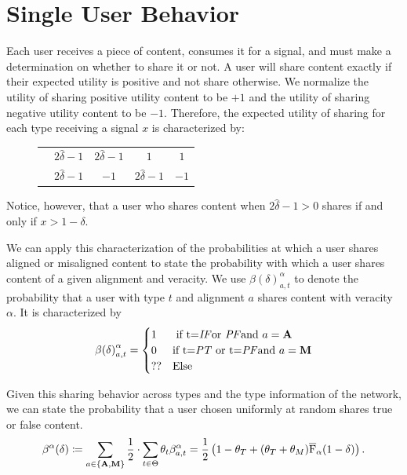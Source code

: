 \section{Single User Behavior}\label{sec:user_behavior}

Each user receives a piece of content, consumes it for a signal, and must make a determination on whether to share it or not. A user will share content exactly if their expected utility is positive and not share otherwise.  We normalize the utility of sharing positive utility content to be $+1$ and the utility of sharing negative utility content to be $-1$. Therefore, the expected utility of sharing for each type receiving a signal $x$ is characterized by: 

\begin{figure} 
    \centering 
\begin{tabular}{ccccc}
   \toprule 
   &  \IT{} & \PT{} & \IF{} & \PF{} \\
   \midrule
  \alg{} & $2\hat{\delta} -1$ & $2\hat{\delta} -1$ & $1$ & $1$ \\
  \mal{} & $2\hat{\delta} -1$ & $-1$ & $2\hat{\delta} -1$ & $-1$ \\
  \bottomrule
\end{tabular}
\end{figure}

Notice, however, that a user who shares content when $2\hat{\delta} -1 > 0$ shares if and only if $x > 1 - \delta$. 

We can apply this characterization of the probabilities at which a user shares aligned or misaligned content to state the probability with which a user shares content of a given alignment and veracity. We use ${\beta(\delta)}^\alpha_{a,t}$ to denote the probability that a user with type $t$ and alignment $a$ shares content with veracity $\alpha$.  It is characterized by 
\begin{equation}
    {\beta(\delta)}^\alpha_{a,t} = \begin{cases} 1  & \text{ if t=\textit{IF}{}or \textit{PF}{}and } a=\mathbf{A} \\
    0 & \text{if t=\textit{PT}{} or t=\textit{PF}{}and } a=\mathbf{M} \\ 
    ?? & \text{Else} \end{cases}
\end{equation}


Given this sharing behavior across types and the type information of the network, we can state the probability that a user chosen uniformly at random shares true or false content. 
\begin{equation}\label{eq:share-probabilities}
\beta^\alpha(\delta) \coloneqq \sum_{a \in \{\mathbf{A}, \mathbf{M}\}} \frac{1}{2} \cdot \sum_{t \in \Theta}  \theta_t  \beta^\alpha_{a, t} = \frac{1}{2} \left(1 - \theta_T + (\theta_T+\theta_M) \overline{\mathrm{F}}_\alpha(1-\delta)  \right). 
\end{equation}

